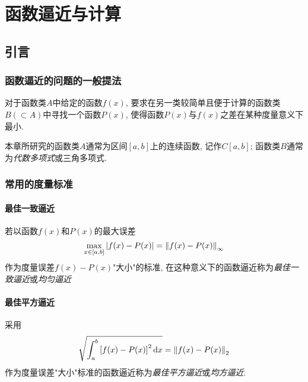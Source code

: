 \chapter{函数逼近与计算}

\section{引言}

\subsection{函数逼近的问题的一般提法}

对于函数类$A$中给定的函数$f(x)$, 要求在另一类较简单且便于计算的函数类$B(\subset A)$中寻找一个函数$P(x)$, 使得函数$P(x)$与$f(x)$之差在某种度量意义下最小.

本章所研究的函数类$A$通常为区间$[a,b]$上的连续函数, 记作$C[a,b]$; 函数类$B$通常为\emph{代数多项式}或三角多项式.

\subsection{常用的度量标准}

\subsubsection{最佳一致逼近}

\begin{definition}[最佳一致逼近]
    若以函数$f(x)$和$P(x)$的最大误差
    \begin{equation*}
        \max_{x\in[a,b]}\abs{f(x)-P(x)}=\norm{f(x)-P(x)}_\infty
    \end{equation*}
    作为度量误差$f(x)-P(x)$"大小"的标准, 在这种意义下的函数逼近称为\emph{最佳一致逼近}或\emph{均匀逼近}
\end{definition}

\subsubsection{最佳平方逼近}

\begin{definition}[最佳平方逼近]
    采用
    \begin{equation*}
        \sqrt{\int_a^b\left[f(x)-P(x)\right]^2\dd{x}}=\norm{f(x)-P(x)}_2
    \end{equation*}
    作为度量误差"大小"标准的函数逼近称为\emph{最佳平方逼近}或\emph{均方逼近}.
\end{definition}

